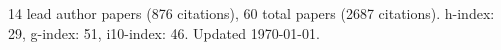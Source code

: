 14 lead author papers (876 citations),
60 total papers (2687 citations).\newline
h-index: 29, g-index: 51, i10-index: 46. Updated \today.